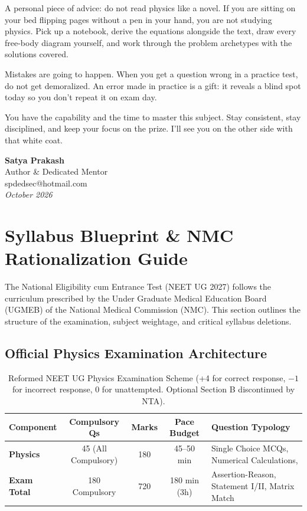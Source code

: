 \documentclass[10pt,twoside,openright]{book}
\begin{document}
A personal piece of advice: do not read physics like a novel. If you are sitting on your bed flipping pages without a pen in your hand, you are not studying physics. Pick up a notebook, derive the equations alongside the text, draw every free-body diagram yourself, and work through the problem archetypes with the solutions covered.

Mistakes are going to happen. When you get a question wrong in a practice test, do not get demoralized. An error made in practice is a gift: it reveals a blind spot today so you don't repeat it on exam day.

You have the capability and the time to master this subject. Stay consistent, stay disciplined, and keep your focus on the prize. I'll see you on the other side with that white coat.

\vspace{1cm}
\begin{flushright}
  \textbf{Satya Prakash}\\
  Author \& Dedicated Mentor\\
  spdedsec@hotmail.com\\
  \textit{October 2026}
\end{flushright}
\cleardoublepage

\chapter*{Syllabus Blueprint \& NMC Rationalization Guide}

The National Eligibility cum Entrance Test (NEET UG 2027) follows the curriculum prescribed by the Under Graduate Medical Education Board (UGMEB) of the National Medical Commission (NMC). This section outlines the structure of the examination, subject weightage, and critical syllabus deletions.

\section*{Official Physics Examination Architecture}

\begin{table}[htbp]
\centering
\footnotesize
\setlength{\tabcolsep}{3.5pt}
\renewcommand{\arraystretch}{1.2}
\begin{tabularx}{\textwidth}{l c c c Y}
\toprule
\textbf{Component} & \textbf{Compulsory Qs} & \textbf{Marks} & \textbf{Pace Budget} & \textbf{Question Typology} \\
\midrule
\textbf{Physics} & 45 (All Compulsory) & 180 & 45--50 min & Single Choice MCQs, Numerical Calculations, \\
\textbf{Exam Total} & 180 Compulsory & 720 & 180 min (3h) & Assertion-Reason, Statement I/II, Matrix Match \\
\bottomrule
\end{tabularx}
\caption{Reformed NEET UG Physics Examination Scheme (+4 for correct response, $-1$ for incorrect response, 0 for unattempted. Optional Section B discontinued by NTA).}
\end{table}
\end{document}
